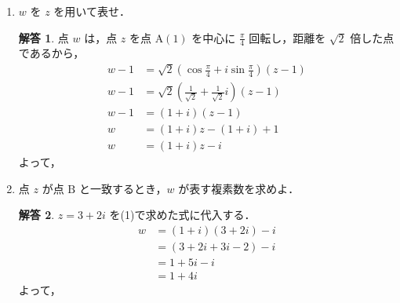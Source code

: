 \documentclass[dvipdfmx]{jlreq}
\theoremstyle{definition}
\newtheorem*{solution}{解答}
\begin{document}
\begin{enumerate}[label=(\arabic*)]
    \item $w$ を $z$ を用いて表せ．
    \begin{solution}
    点 $w$ は，点 $z$ を点 $\mathrm{A}(1)$ を中心に $\frac{\pi}{4}$ 回転し，距離を $\sqrt{2}$ 倍した点であるから，
    \begin{align*}
        w - 1 &= \sqrt{2} \left( \cos \frac{\pi}{4} + i \sin \frac{\pi}{4} \right) (z - 1) \\
        w - 1 &= \sqrt{2} \left( \frac{1}{\sqrt{2}} + \frac{1}{\sqrt{2}}i \right) (z - 1) \\
        w - 1 &= (1+i)(z - 1) \\
        w &= (1+i)z - (1+i) + 1 \\
        w &= (1+i)z - i
    \end{align*}
    よって，
    \end{solution}

    \item 点 $z$ が点 $\mathrm{B}$ と一致するとき，$w$ が表す複素数を求めよ．
    \begin{solution}
    $z = 3+2i$ を(1)で求めた式に代入する．
    \begin{align*}
        w &= (1+i)(3+2i) - i \\
          &= (3 + 2i + 3i - 2) - i \\
          &= 1 + 5i - i \\
          &= 1 + 4i
    \end{align*}
    よって，
    \end{solution}


\end{enumerate}
\end{document}
